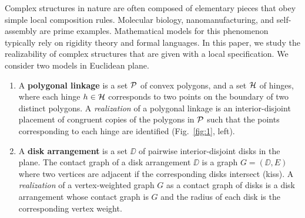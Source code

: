 Complex structures in nature are often composed of elementary pieces that obey simple local composition rules. Molecular biology, nanomanufacturing, and self-assembly are prime examples. Mathematical models for this phenomenon typically rely on rigidity theory and formal languages. In this paper, we study the realizability of complex structures that are given with a local specification. We consider two models in Euclidean plane.

\begin{enumerate}
\item A \textbf{polygonal linkage} is a set ${\cal P}$ of convex polygons, and a set ${\cal H}$ of hinges,
where each hinge $h\in {\cal H}$ corresponds to two points on the boundary of two distinct polygons.
A \emph{realization} of a polygonal linkage is an interior-disjoint placement of congruent copies of the polygons in ${\cal P}$ such that the points corresponding to each hinge are identified (Fig.~\ref{fig:1}, left).
\item A \textbf{disk arrangement} is a set $\DD$ of pairwise interior-disjoint disks in the plane. The contact graph of a disk arrangement $\DD$ is a graph $G=(\DD,E)$ where two vertices are adjacent if the corresponding disks intersect (kiss). A \emph{realization} of a vertex-weighted graph $G$ as a contact graph of disks is a disk arrangement whose contact graph is $G$ and the radius of each disk is the corresponding vertex weight.
\end{enumerate}
